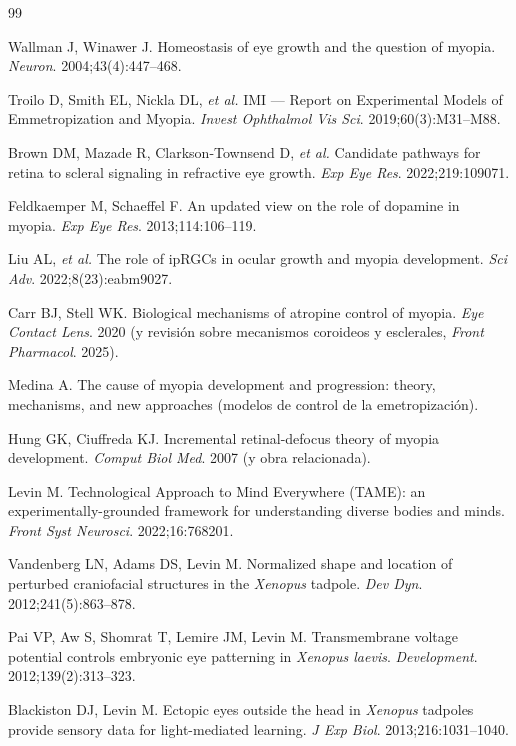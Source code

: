 \documentclass[11pt,a4paper]{article}
\begin{document}
\begin{thebibliography}{99}
\setlength{\itemsep}{2pt}

 Wallman J, Winawer J. Homeostasis of eye growth and the question of myopia. \emph{Neuron}. 2004;43(4):447--468.

 Troilo D, Smith EL, Nickla DL, \emph{et al.} IMI --- Report on Experimental Models of Emmetropization and Myopia. \emph{Invest Ophthalmol Vis Sci}. 2019;60(3):M31--M88.

 Brown DM, Mazade R, Clarkson-Townsend D, \emph{et al.} Candidate pathways for retina to scleral signaling in refractive eye growth. \emph{Exp Eye Res}. 2022;219:109071.

 Feldkaemper M, Schaeffel F. An updated view on the role of dopamine in myopia. \emph{Exp Eye Res}. 2013;114:106--119.

 Liu AL, \emph{et al.} The role of ipRGCs in ocular growth and myopia development. \emph{Sci Adv}. 2022;8(23):eabm9027.

 Carr BJ, Stell WK. Biological mechanisms of atropine control of myopia. \emph{Eye Contact Lens}. 2020 (y revisión sobre mecanismos coroideos y esclerales, \emph{Front Pharmacol}. 2025).

 Medina A. The cause of myopia development and progression: theory, mechanisms, and new approaches (modelos de control de la emetropización).

 Hung GK, Ciuffreda KJ. Incremental retinal-defocus theory of myopia development. \emph{Comput Biol Med}. 2007 (y obra relacionada).

 Levin M. Technological Approach to Mind Everywhere (TAME): an experimentally-grounded framework for understanding diverse bodies and minds. \emph{Front Syst Neurosci}. 2022;16:768201.

 Vandenberg LN, Adams DS, Levin M. Normalized shape and location of perturbed craniofacial structures in the \emph{Xenopus} tadpole. \emph{Dev Dyn}. 2012;241(5):863--878.

 Pai VP, Aw S, Shomrat T, Lemire JM, Levin M. Transmembrane voltage potential controls embryonic eye patterning in \emph{Xenopus laevis}. \emph{Development}. 2012;139(2):313--323.

 Blackiston DJ, Levin M. Ectopic eyes outside the head in \emph{Xenopus} tadpoles provide sensory data for light-mediated learning. \emph{J Exp Biol}. 2013;216:1031--1040.


\end{thebibliography}
\end{document}
